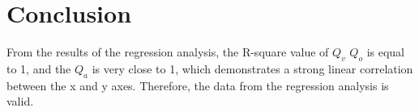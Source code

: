 \section{Conclusion}
\label{sec:conclusion}
From the results of the regression analysis, 
the R-square value of $Q_v$ $Q_o$ is equal to 1, and the $Q_a$ is very close to 1,
which demonstrates a strong linear correlation between the x and y axes.
Therefore, the data from the regression analysis is valid.